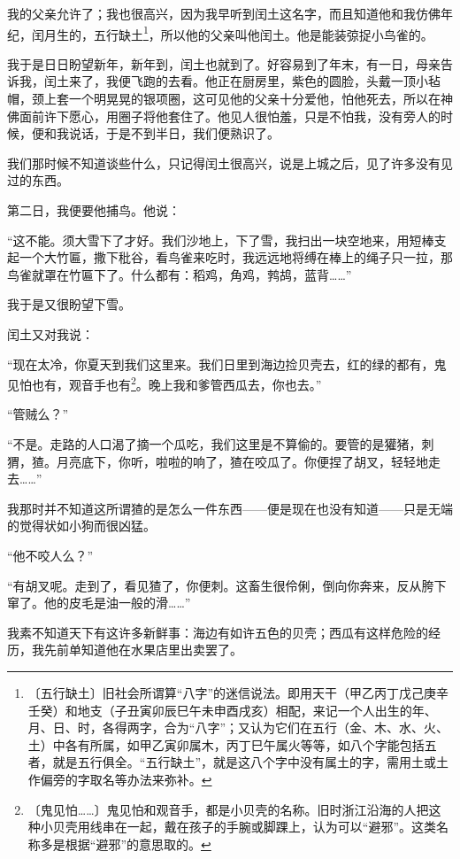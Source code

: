 \documentclass[12pt,UTF-8,openany]{ctexbook}
\begin{document}
\begin{large}
    我的父亲允许了；我也很高兴，因为我早听到闰土这名字，而且知道他和我仿佛年纪，闰月生的，五行缺土\footnote{〔五行缺土〕旧社会所谓算“八字”的迷信说法。即用天干（甲乙丙丁戊己庚辛壬癸）和地支（子丑寅卯辰巳午未申酉戌亥）相配，来记一个人出生的年、月、日、时，各得两字，合为“八字”；又认为它们在五行（金、木、水、火、土）中各有所属，如甲乙寅卯属木，丙丁巳午属火等等，如八个字能包括五者，就是五行俱全。“五行缺土”，就是这八个字中没有属土的字，需用土或土作偏旁的字取名等办法来弥补。}，所以他的父亲叫他闰土。他是能装弶捉小鸟雀的。
    
    我于是日日盼望新年，新年到，闰土也就到了。好容易到了年末，有一日，母亲告诉我，闰土来了，我便飞跑的去看。他正在厨房里，紫色的圆脸，头戴一顶小毡帽，颈上套一个明晃晃的银项圈，这可见他的父亲十分爱他，怕他死去，所以在神佛面前许下愿心，用圈子将他套住了。他见人很怕羞，只是不怕我，没有旁人的时候，便和我说话，于是不到半日，我们便熟识了。
    
    我们那时候不知道谈些什么，只记得闰土很高兴，说是上城之后，见了许多没有见过的东西。
    
    第二日，我便要他捕鸟。他说：
    
    “这不能。须大雪下了才好。我们沙地上，下了雪，我扫出一块空地来，用短棒支起一个大竹匾，撒下秕谷，看鸟雀来吃时，我远远地将缚在棒上的绳子只一拉，那鸟雀就罩在竹匾下了。什么都有：稻鸡，角鸡，鹁鸪，蓝背……”
    
    我于是又很盼望下雪。
    
    闰土又对我说：
    
    “现在太冷，你夏天到我们这里来。我们日里到海边捡贝壳去，红的绿的都有，鬼见怕也有，观音手也有\footnote{〔鬼见怕……〕鬼见怕和观音手，都是小贝壳的名称。旧时浙江沿海的人把这种小贝壳用线串在一起，戴在孩子的手腕或脚踝上，认为可以“避邪”。这类名称多是根据“避邪”的意思取的。}。晚上我和爹管西瓜去，你也去。”
    
    “管贼么？”
    
    “不是。走路的人口渴了摘一个瓜吃，我们这里是不算偷的。要管的是獾猪，刺猬，猹。月亮底下，你听，啦啦的响了，猹在咬瓜了。你便捏了胡叉，轻轻地走去……”
    
    我那时并不知道这所谓猹的是怎么一件东西——便是现在也没有知道——只是无端的觉得状如小狗而很凶猛。
    
    “他不咬人么？”
    
    “有胡叉呢。走到了，看见猹了，你便刺。这畜生很伶俐，倒向你奔来，反从胯下窜了。他的皮毛是油一般的滑……”
    
    我素不知道天下有这许多新鲜事：海边有如许五色的贝壳；西瓜有这样危险的经历，我先前单知道他在水果店里出卖罢了。
    

\end{large}
\end{document}
